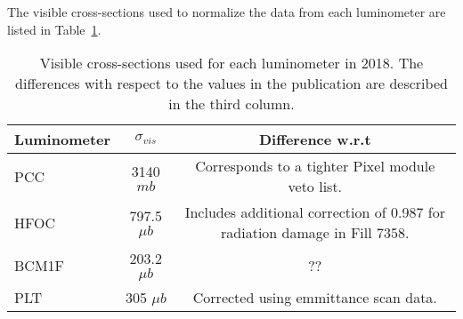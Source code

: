 The visible cross-sections used to normalize the data from each luminometer are listed in Table~\ref{tab:crossections}.

\begin{table}[h]
  \caption{Visible cross-sections used for each luminometer in 2018. The differences with respect to the values in the publication \cite{CMS-PAS-LUM-18-002} are described in the third column.}
  \label{tab:crossections}
  \begin{center}
    \begin{tabular}{l|c|c}
      \hline
      Luminometer & $\sigma_{vis}$ & Difference w.r.t \cite{CMS-PAS-LUM-18-002}\\
      \hline
      PCC   &  3140 $mb$     & Corresponds to a tighter Pixel module veto list. \\
      HFOC  &  797.5 $\mu b$ & Includes additional correction of 0.987 for radiation damage in Fill 7358. \\
      BCM1F &  203.2 $\mu b$ &  ?? \\
      PLT   &  305 $\mu b$   & Corrected using emmittance scan data. \\
      \hline\hline
    \end{tabular}
  \end{center}
\end{table}



